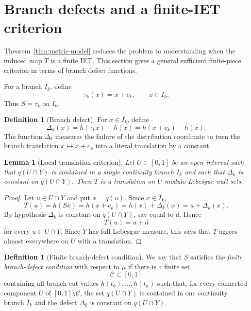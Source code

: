 \documentclass[11pt]{amsart}
\theoremstyle{plain}
\newtheorem{lemma}[theorem]{Lemma}
\theoremstyle{definition}
\newtheorem{definition}[theorem]{Definition}
\theoremstyle{remark}
\newcommand{\cC}{\mathcal C}
\begin{document}
\section{Branch defects and a finite-IET criterion}

Theorem~\ref{thm:metric-model} reduces the problem to understanding when the induced map $T$ is a finite IET. This section gives a general sufficient finite-piece criterion in terms of branch defect functions.

For a branch $I_k$, define
\[
        \tau_k(x)=x+c_k,
        \qquad x\in I_k.
\]
Thus $S=\tau_k$ on $I_k$.

\begin{definition}[Branch defect]
For $x\in I_k$, define
\[
        \Delta_k(x)=h(\tau_k x)-h(x)=h(x+c_k)-h(x).
\]
The function $\Delta_k$ measures the failure of the distribution coordinate to turn the branch translation $x\mapsto x+c_k$ into a literal translation by a constant.
\end{definition}

\begin{lemma}[Local translation criterion]\label{lem:local-translation-criterion}
Let $U\subset[0,1]$ be an open interval such that $q(U\cap Y)$ is contained in a single continuity branch $I_k$ and such that $\Delta_k$ is constant on $q(U\cap Y)$. Then $T$ is a translation on $U$ modulo Lebesgue-null sets.
\end{lemma}

\begin{proof}
Let $u\in U\cap Y$ and put $x=q(u)$. Since $x\in I_k$,
\[
        T(u)=h(Sx)=h(x+c_k)=h(x)+\Delta_k(x)=u+\Delta_k(x).
\]
By hypothesis $\Delta_k$ is constant on $q(U\cap Y)$, say equal to $d$. Hence
\[
        T(u)=u+d
\]
for every $u\in U\cap Y$. Since $Y$ has full Lebesgue measure, this says that $T$ agrees almost everywhere on $U$ with a translation.
\end{proof}

\begin{definition}[Finite branch-defect condition]\label{def:finite-defect}
We say that $S$ satisfies the \emph{finite branch-defect condition} with respect to $\mu$ if there is a finite set
\[
        \cC\subset[0,1]
\]
containing all branch cut values $h(t_0),\ldots,h(t_n)$ such that, for every connected component $U$ of $[0,1]\setminus\cC$, the set $q(U\cap Y)$ is contained in one continuity branch $I_k$ and the defect $\Delta_k$ is constant on $q(U\cap Y)$.
\end{definition}
\end{document}
